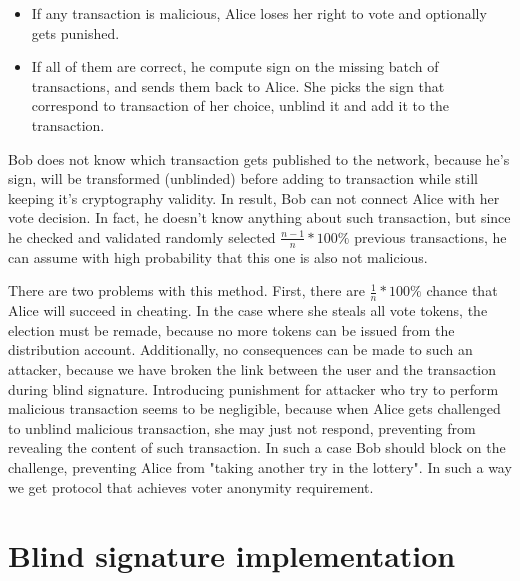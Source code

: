 \documentclass[runningheads]{llncs}
\begin{document}
\begin{itemize}
 \item If any transaction is malicious, Alice loses her right to vote and optionally gets punished.

 \item If all of them are correct, he compute sign on the missing batch of transactions, and sends them back to Alice. She picks the sign that correspond to transaction of her choice, unblind it and add it to the transaction.
\end{itemize}

Bob does not know which transaction gets published to the network, because he's sign, will be transformed (unblinded) before adding to transaction while still keeping it's cryptography validity. In result, Bob can not connect Alice with her vote decision. In fact, he doesn't know anything about such transaction, but since he checked and validated randomly selected \(\frac{n-1}{n}*100\%\) previous transactions, he can assume with high probability that this one is also not malicious.

There are two problems with this method.
First, there are \(\frac{1}{n}*100\%\) chance that Alice will succeed in cheating. In the case where she steals all vote tokens, the election must be remade, because no more tokens can be issued from the distribution account. Additionally, no consequences can be made to such an attacker, because we have broken the link between the user and the transaction during blind signature. Introducing punishment for attacker who try to perform malicious transaction seems to be negligible, because when Alice gets challenged to unblind malicious transaction, she may just not respond, preventing from revealing the content of such transaction. In such a case Bob should block on the challenge, preventing Alice from "taking another try in the lottery".
In such a way  we get protocol that achieves voter anonymity requirement.




\section{Blind signature implementation}
\end{document}
